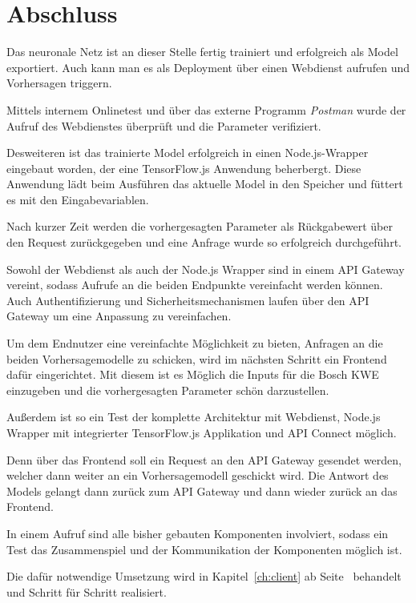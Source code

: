 \section{Abschluss}
Das neuronale Netz ist an dieser Stelle fertig trainiert und erfolgreich als Model exportiert. Auch kann man es als
Deployment über einen Webdienst aufrufen und Vorhersagen triggern.

Mittels internem Onlinetest und über das externe Programm \textit{Postman} wurde der Aufruf des Webdienstes überprüft
und die Parameter verifiziert.

Desweiteren ist das trainierte Model erfolgreich in einen Node.js-Wrapper eingebaut worden, der eine TensorFlow.js
Anwendung beherbergt. Diese Anwendung lädt beim Ausführen das aktuelle Model in den Speicher und füttert es mit den
Eingabevariablen.

Nach kurzer Zeit werden die vorhergesagten Parameter als Rückgabewert über den Request zurückgegeben und eine Anfrage
wurde so erfolgreich durchgeführt.

Sowohl der Webdienst als auch der Node.js Wrapper sind in einem API Gateway vereint, sodass Aufrufe an die beiden
Endpunkte vereinfacht werden können. Auch Authentifizierung und Sicherheitsmechanismen laufen über den API Gateway um
eine Anpassung zu vereinfachen.

Um dem Endnutzer eine vereinfachte Möglichkeit zu bieten, Anfragen an die beiden Vorhersagemodelle zu schicken, wird
im nächsten Schritt ein Frontend dafür eingerichtet. Mit diesem ist es Möglich die Inputs für die Bosch KWE einzugeben
und die vorhergesagten Parameter schön darzustellen.

Außerdem ist so ein Test der komplette Architektur mit Webdienst, Node.js Wrapper mit integrierter TensorFlow.js
Applikation und API Connect möglich.

Denn über das Frontend soll ein Request an den API Gateway gesendet werden, welcher dann weiter an ein Vorhersagemodell
geschickt wird. Die Antwort des Models gelangt dann zurück zum API Gateway und dann wieder zurück an das Frontend.

In einem Aufruf sind alle bisher gebauten Komponenten involviert, sodass ein Test das Zusammenspiel und der
Kommunikation der Komponenten möglich ist.

Die dafür notwendige Umsetzung wird in Kapitel~\ref{ch:client} ab Seite~\pageref{ch:client} behandelt und Schritt für
Schritt realisiert.